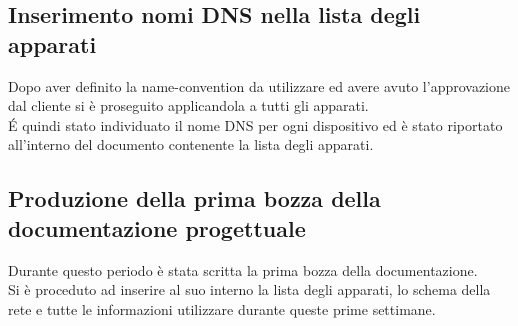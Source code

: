\documentclass[Realizzazione.tex]{subfiles}
\begin{document}
\subsection{Inserimento nomi DNS nella lista degli apparati}
Dopo aver definito la name-convention da utilizzare ed avere avuto l'approvazione dal cliente si è proseguito applicandola a tutti gli apparati. \\
\'E quindi stato individuato il nome DNS per ogni dispositivo ed è stato riportato all'interno del documento contenente la lista degli apparati.

\subsection{Produzione della prima bozza della documentazione progettuale}
Durante questo periodo è stata scritta la prima bozza della documentazione. \\
Si è proceduto ad inserire al suo interno la lista degli apparati, lo schema della rete e tutte le informazioni utilizzare durante queste prime settimane.
\end{document}
